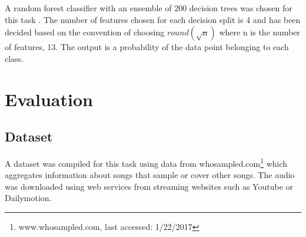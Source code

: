 \documentclass{article}
\begin{document}
A random forest classifier with an ensemble of 200 decision trees was chosen for this task \cite{breiman2001random}. The number of features chosen for each decision split is 4 and has been decided based on the convention of choosing $round(\sqrt{\mathrm{n}})$ where $\mathrm{n}$ is the number of features, 13. The output is a probability of the data point belonging to each class.


\section{Evaluation}
\label{eval}

\subsection{Dataset}
A dataset was compiled for this task using data from whosampled.com\footnote{www.whosampled.com, last accessed: 1/22/2017} which aggregates information about songs that sample or cover other songs. The audio was downloaded using web services from streaming websites such as Youtube or Dailymotion.
\end{document}
